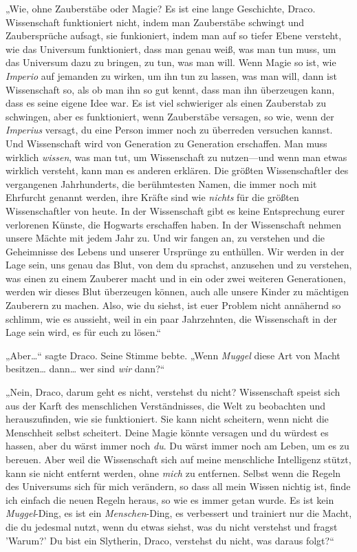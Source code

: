 {„Wie, ohne Zauberstäbe oder Magie? Es ist eine lange Geschichte, Draco. Wissenschaft funktioniert nicht, indem man Zauberstäbe schwingt und Zaubersprüche aufsagt, sie funkioniert, indem man auf so tiefer Ebene versteht, wie das Universum funktioniert, dass man genau weiß, was man tun muss, um das Universum dazu zu bringen, zu tun, was man will. Wenn Magie so ist, wie \emph{Imperio} auf jemanden zu wirken, um ihn tun zu lassen, was man will, dann ist Wissenschaft so, als ob man ihn so gut kennt, dass man ihn überzeugen kann, dass es seine eigene Idee war. Es ist viel schwieriger als einen Zauberstab zu schwingen, aber es funktioniert, wenn Zauberstäbe versagen, so wie, wenn der \emph{Imperius} versagt, du eine Person immer noch zu überreden versuchen kannst. Und Wissenschaft wird von Generation zu Generation erschaffen. Man muss wirklich \emph{wissen}, was man tut, um Wissenschaft zu nutzen—und wenn man etwas wirklich versteht, kann man es anderen erklären. Die größten Wissenschaftler des vergangenen Jahrhunderts, die berühmtesten Namen, die immer noch mit Ehrfurcht genannt werden, ihre Kräfte sind wie \emph{nichts} für die größten Wissenschaftler von heute. In der Wissenschaft gibt es keine Entsprechung eurer verlorenen Künste, die Hogwarts erschaffen haben. In der Wissenschaft nehmen unsere Mächte mit jedem Jahr zu. Und wir fangen an, zu verstehen und die Geheimnisse des Lebens und unserer Ursprünge zu enthüllen. Wir werden in der Lage sein, uns genau das Blut, von dem du sprachst, anzusehen und zu verstehen, was einen zu einem Zauberer macht und in ein oder zwei weiteren Generationen, werden wir dieses Blut überzeugen können, auch alle unsere Kinder zu mächtigen Zauberern zu machen. Also, wie du siehst, ist euer Problem nicht annähernd so schlimm, wie es aussieht, weil in ein paar Jahrzehnten, die Wissenschaft in der Lage sein wird, es für euch zu lösen.“

„Aber…“ sagte Draco. Seine Stimme bebte. „Wenn \emph{Muggel} diese Art von Macht besitzen… dann… wer sind \emph{wir} dann?“

„Nein, Draco, darum geht es nicht, verstehst du nicht? Wissenschaft speist sich aus der Karft des menschlichen Verständnisses, die Welt zu beobachten und herauszufinden, wie sie funktioniert. Sie kann nicht scheitern, wenn nicht die Menschheit selbst scheitert. Deine Magie könnte versagen und du würdest es hassen, aber du wärst immer noch \emph{du}. Du wärst immer noch am Leben, um es zu bereuen. Aber weil die Wissenschaft sich auf meine menschliche Intelligenz stützt, kann sie nicht entfernt werden, ohne \emph{mich} zu entfernen. Selbst wenn die Regeln des Universums sich für mich verändern, so dass all mein Wissen nichtig ist, finde ich einfach die neuen Regeln heraus, so wie es immer getan wurde. Es ist kein \emph{Muggel}-Ding, es ist ein \emph{Menschen}-Ding, es verbessert und trainiert nur die Macht, die du jedesmal nutzt, wenn du etwas siehst, was du nicht verstehst und fragst 'Warum?' Du bist ein Slytherin, Draco, verstehst du nicht, was daraus folgt?“

}
